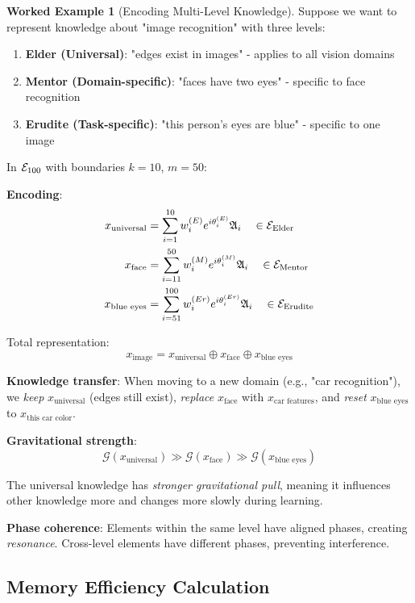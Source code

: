 \documentclass[12pt,a4paper]{article}
\theoremstyle{definition}
\newtheorem{example}{Worked Example}[section]
\theoremstyle{remark}
\begin{document}
\begin{example}[Encoding Multi-Level Knowledge]
Suppose we want to represent knowledge about "image recognition" with three levels:

\begin{enumerate}
\item \textbf{Elder (Universal)}: "edges exist in images" - applies to all vision domains
\item \textbf{Mentor (Domain-specific)}: "faces have two eyes" - specific to face recognition
\item \textbf{Erudite (Task-specific)}: "this person's eyes are blue" - specific to one image
\end{enumerate}

In $\mathcal{E}_{100}$ with boundaries $k=10$, $m=50$:

\textbf{Encoding}:
\begin{align}
x_{\text{universal}} &= \sum_{i=1}^{10} w_i^{(E)} e^{i\theta_i^{(E)}} \mathfrak{A}_{i} \quad \in \mathcal{E}_{\text{Elder}} \\
x_{\text{face}} &= \sum_{i=11}^{50} w_i^{(M)} e^{i\theta_i^{(M)}} \mathfrak{A}_{i} \quad \in \mathcal{E}_{\text{Mentor}} \\
x_{\text{blue eyes}} &= \sum_{i=51}^{100} w_i^{(Er)} e^{i\theta_i^{(Er)}} \mathfrak{A}_{i} \quad \in \mathcal{E}_{\text{Erudite}}
\end{align}

Total representation:
$$x_{\text{image}} = x_{\text{universal}} \oplus x_{\text{face}} \oplus x_{\text{blue eyes}}$$

\textbf{Knowledge transfer}: When moving to a new domain (e.g., "car recognition"), we \textit{keep} $x_{\text{universal}}$ (edges still exist), \textit{replace} $x_{\text{face}}$ with $x_{\text{car features}}$, and \textit{reset} $x_{\text{blue eyes}}$ to $x_{\text{this car color}}$.

\textbf{Gravitational strength}:
$$\mathcal{G}(x_{\text{universal}}) \gg \mathcal{G}(x_{\text{face}}) \gg \mathcal{G}(x_{\text{blue eyes}})$$

The universal knowledge has \textit{stronger gravitational pull}, meaning it influences other knowledge more and changes more slowly during learning.

\textbf{Phase coherence}: Elements within the same level have aligned phases, creating \textit{resonance}. Cross-level elements have different phases, preventing interference.
\end{example}

\subsection{Memory Efficiency Calculation}
\end{document}
